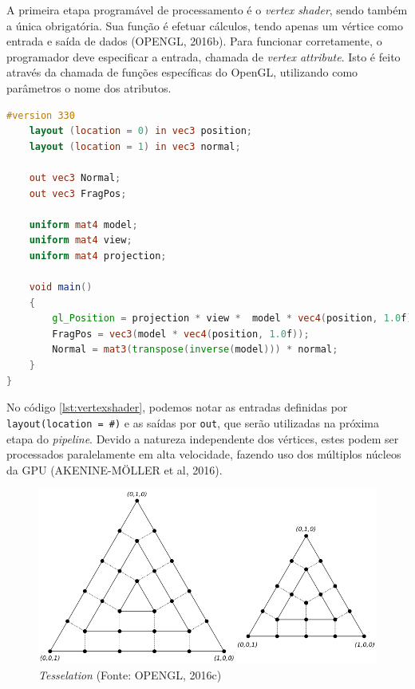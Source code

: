 A primeira etapa programável de processamento é o \textit{vertex shader}, sendo também a única obrigatória. Sua função é efetuar cálculos, tendo apenas um vértice como entrada e saída de dados (OPENGL, 2016b). Para funcionar corretamente, o programador deve especificar a entrada, chamada de \textit{vertex attribute}. Isto é feito através da chamada de funções específicas do OpenGL, utilizando como parâmetros o nome dos atributos.

\begin{lstlisting}[language=glsl,
label={lst:vertexshader},
caption="Exemplo de \textit{vertex shader}"]
	#version 330
	layout (location = 0) in vec3 position;
	layout (location = 1) in vec3 normal;
	
	out vec3 Normal;
	out vec3 FragPos;
	
	uniform mat4 model;
	uniform mat4 view;
	uniform mat4 projection;
	
	void main()
	{
		gl_Position = projection * view *  model * vec4(position, 1.0f);
		FragPos = vec3(model * vec4(position, 1.0f));
		Normal = mat3(transpose(inverse(model))) * normal;  
	} 
}
\end{lstlisting}

No código \ref{lst:vertexshader}, podemos notar as entradas definidas por \lstinline{layout(location = #)} e as saídas por \lstinline{out}, que serão utilizadas na próxima etapa do \textit{pipeline}. Devido a natureza independente dos vértices, estes podem ser processados paralelamente em alta velocidade, fazendo uso dos múltiplos núcleos da GPU (AKENINE-MÖLLER et al, 2016).

\begin{figure}[H]
	\centering
	\includegraphics[scale=0.5]{imagens/tesselation.png}
	\caption[\textit{Tesselation}]{\textit{Tesselation} (Fonte: OPENGL, 2016c)}
	\label{fig:tesselation}
\end{figure}

